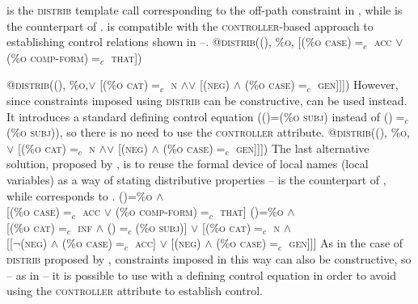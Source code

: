 \documentclass[output=paper]{../langscibook}
\begin{document}
 is the \textsc{distrib} template
call corresponding to the off-path constraint in
, while  is the
counterpart of .
 is compatible with the
\textsc{controller}-based approach to establishing control relations
shown in –.
\ea\label{kapl:17:fn6:i:call} \textsc{@distrib((\UP\OBJ), \%o, [(\%o case)$=_{c}$ acc $\lor$ (\%o comp-form)$=_{c}$ that])}
  \item\label{kapl:17:fn6:i:call2} \textsc{@distrib((\UP\OBJ), \%o,\newline [(\%o cat)$=_{c}$ inf $\land$ (\UP\SUBJ)$=_{c}$(\%o subj)] $\lor$ [(\%o cat)$=_{c}$ n $\land$\newline [[$\neg$(\UP neg) $\land$ (\%o case)$=_{c}$ acc] $\lor$ [(\UP neg) $\land$ (\%o case)$=_{c}$ gen]]])}
\z
However, since constraints imposed using
\textsc{distrib} can be constructive,
 can be used instead. It introduces
a standard defining control equation (\textsc{(\UP\SUBJ)=(\%o subj)} instead of \textsc{(\UP\SUBJ)$=_{c}$(\%o subj)}), so there is no need to use the
\textsc{controller} attribute.
\ea\label{kapl:17:fn6:i:call2:constr} \textsc{@distrib((\UP\OBJ), \%o,\newline [(\%o cat)$=_{c}$ inf $\land$ (\UP\SUBJ)=(\%o subj)] $\lor$ [(\%o cat)$=_{c}$ n $\land$\newline [[$\neg$(\UP neg) $\land$ (\%o case)$=_{c}$ acc] $\lor$ [(\UP neg) $\land$ (\%o case)$=_{c}$ gen]]])}
\z
The last alternative solution, proposed by \citet{PP2021},
is to reuse the formal device of local names (local variables) as a
way of stating distributive properties –
 is the counterpart of
, while
 corresponds to
.
\ea\label{ex:unlikes:disj:off:like:prz:pat:21}
  \textsc{(\UP\OBJ)=\%o $\land$} \\
  \textsc{[(\%o case)$=_{c}$ acc $\lor$ (\%o comp-form)$=_{c}$ that]}\z
\ea\label{ex:pat:prz:14:32:MOD:like:prz:pat:21}
  \textsc{(\UP\OBJ)=\%o $\land$} \\
  \textsc{[(\%o cat)$=_{c}$ inf $\land$ (\UP\SUBJ)$=_{c}$(\%o subj)] $\lor$ [(\%o cat)$=_{c}$ n $\land$} \\
  \textsc{[[$\neg$(\UP neg) $\land$ (\%o case)$=_{c}$ acc] $\lor$ [(\UP neg) $\land$ (\%o case)$=_{c}$ gen]]]}
\z
As in the case of \textsc{distrib}
proposed by \citet{kapl:17}, constraints imposed in this way can
also be constructive, so – as in  – it is possible to use
 with a defining control
equation in order to avoid using the \textsc{controller} attribute to
establish control.
\end{document}
